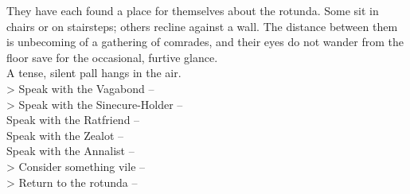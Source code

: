 They have each found a place for themselves about the rotunda. Some sit in chairs or on stairsteps; others recline against a wall. The distance between them is unbecoming of a gathering of comrades, and their eyes do not wander from the floor save for the occasional, furtive glance.\\

A tense, silent pall hangs in the air.\\

> Speak with the Vagabond -- \\
> Speak with the Sinecure-Holder -- \\
 Speak with the Ratfriend -- \\
 Speak with the Zealot -- \\
 Speak with the Annalist -- \\
> Consider something vile -- \\
> Return to the rotunda -- 
